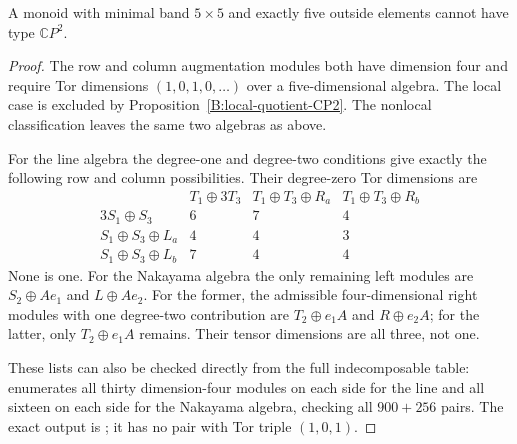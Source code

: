 \begin{lemma}
\label{C:five-by-five-five-outside-CP2}
A monoid with minimal band $5\times5$ and exactly five
outside elements cannot have type $\mathbb CP^2$.
\end{lemma}
\begin{proof}
The row and column augmentation modules both have dimension
four and require Tor dimensions $(1,0,1,0,\ldots)$ over a
five-dimensional algebra.  The local case is excluded by
Proposition~\ref{B:local-quotient-CP2}.  The nonlocal
classification leaves the same two algebras as above.

For the line algebra the degree-one and degree-two conditions
give exactly the following row and column possibilities.
Their degree-zero Tor dimensions are
\[
\begin{array}{c|ccc}
 &T_1\oplus3T_3&T_1\oplus T_3\oplus R_a&
                  T_1\oplus T_3\oplus R_b\\ \hline
 3S_1\oplus S_3&6&7&4\\
 S_1\oplus S_3\oplus L_a&4&4&3\\
 S_1\oplus S_3\oplus L_b&7&4&4
\end{array}
\]
None is one.
For the Nakayama algebra the only remaining left modules are
$S_2\oplus Ae_1$ and $L\oplus Ae_2$.
For the former, the admissible four-dimensional right modules
with one degree-two contribution are
$T_2\oplus e_1A$ and $R\oplus e_2A$;
for the latter, only $T_2\oplus e_1A$ remains.
Their tensor dimensions are all three, not one.

These lists can also be checked directly from the full
indecomposable table: 
enumerates all thirty dimension-four modules on each side
for the line and all sixteen on each side for the Nakayama
algebra, checking all $900+256$ pairs.
The exact output is
; it has
no pair with Tor triple $(1,0,1)$.
\end{proof}

